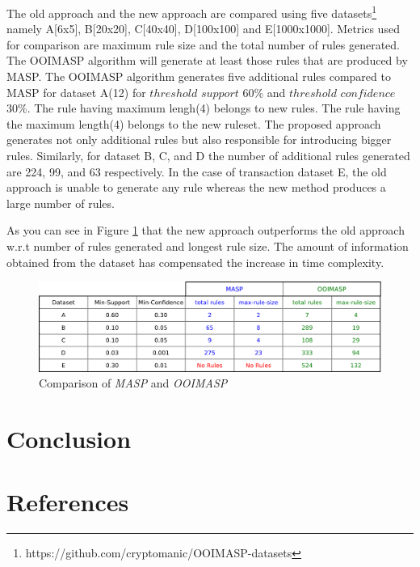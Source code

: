 \documentclass[preprint]{elsarticle}
\begin{document}
The old approach and the new approach are compared using five datasets\footnote{\label{datasetlink} https://github.com/cryptomanic/OOIMASP-datasets} namely A[6x5], B[20x20], C[40x40], D[100x100] and E[1000x1000]. Metrics used for comparison are maximum rule size and the total number of rules generated. The OOIMASP algorithm will generate at least those rules that are produced by MASP. The OOIMASP algorithm generates five additional rules compared to MASP for dataset A(12) for $ threshold $ $ support $ 60\% and $ threshold $ $ confidence $ 30\%. The rule having maximum lengh(4) belongs to new rules. The rule having the maximum length(4) belongs to the new ruleset. The proposed approach generates not only additional rules but also responsible for introducing bigger rules. Similarly, for dataset B, C, and D the number of additional rules generated are 224, 99, and 63 respectively. In the case of transaction dataset E, the old approach is unable to generate any rule whereas the new method produces a large number of rules.

As you can see in Figure \ref{Fig 11} that the new approach outperforms the old approach w.r.t number of rules generated and longest rule size. The amount of information obtained from the dataset has compensated the increase in time complexity.

\begin{figure}
\begin{center}
\includegraphics[scale=0.30]{pdf/comparison}
\end{center}
\caption{Comparison of \emph{MASP} and \emph{OOIMASP}}
\label{Fig 11}
\end{figure}

\section{Conclusion}

\section*{References}


\end{document}
